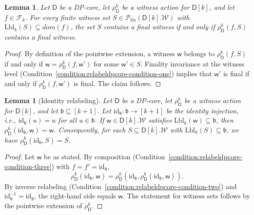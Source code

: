 \documentclass[11pt,a4paper]{article}
\newtheorem{lemma}[theorem]{Lemma}
\newcommand{\treewidthvalue}{k}
\newcommand{\abag}{\mathfrak{b}}
\newcommand{\allwitnesses}{\mathcal{W}}
\newcommand{\awitness}{\mathsf{w}}
\newcommand{\finitepowerset}[1]{\mathcal{P}_{\mathrm{fin}}(#1)}
\newcommand{\dpcore}{\mathsf{D}}
\newcommand{\witnessset}{S}
\newcommand{\domain}{dom}
\newcommand{\relabelingfunction}{f}
\newcommand{\relabelclass}{\mathcal{F}}
\newcommand{\action}{\rho}
\begin{document}
\begin{lemma}
\label{lemma:witness-action-finality-sets}
Let $\dpcore$ be a DP-core, let $\action_{\dpcore}^{\treewidthvalue}$ be a witness action for $\dpcore[\treewidthvalue]$, and let $\relabelingfunction\in \relabelclass_{\treewidthvalue}$. For every finite witness set $\witnessset\in \finitepowerset{\dpcore[\treewidthvalue].\allwitnesses}$ with $\mathrm{Lbl}_{\treewidthvalue}(\witnessset)\subseteq \domain(\relabelingfunction)$, the set $\witnessset$ contains a final witness if and only if $\action_{\dpcore}^{\treewidthvalue}(\relabelingfunction,\witnessset)$ contains a final witness.
\end{lemma}
\begin{proof}
By definition of the pointwise extension, a witness $\awitness$ belongs to $\action_{\dpcore}^{\treewidthvalue}(\relabelingfunction,\witnessset)$ if and only if $\awitness=\action_{\dpcore}^{\treewidthvalue}(\relabelingfunction,\awitness')$ for some $\awitness'\in \witnessset$.
Finality invariance at the witness level (Condition~\ref{condition:relabeldpcore-condition-one}) implies that $\awitness'$ is final if and only if $\action_{\dpcore}^{\treewidthvalue}(\relabelingfunction,\awitness')$ is final. The claim follows.
\end{proof}

\begin{lemma}[Identity relabeling]
\label{lemma:witness-action-identity}
Let $\dpcore$ be a DP-core, let $\action_{\dpcore}^{\treewidthvalue}$ be a witness action for $\dpcore[\treewidthvalue]$, and let $\abag\subseteq [\treewidthvalue+1]$. Let $\mathrm{id}_{\abag}:\abag\to [\treewidthvalue+1]$ be the identity injection, i.e., $\mathrm{id}_{\abag}(u)=u$ for all $u\in \abag$. If $\awitness\in \dpcore[\treewidthvalue].\allwitnesses$ satisfies $\mathrm{Lbl}_{\treewidthvalue}(\awitness)\subseteq \abag$, then $\action_{\dpcore}^{\treewidthvalue}(\mathrm{id}_{\abag},\awitness)=\awitness$. Consequently, for each $\witnessset\subseteq \dpcore[\treewidthvalue].\allwitnesses$ with $\mathrm{Lbl}_{\treewidthvalue}(\witnessset)\subseteq \abag$, we have $\action_{\dpcore}^{\treewidthvalue}(\mathrm{id}_{\abag},\witnessset)=\witnessset$.
\end{lemma}
\begin{proof}
Let $\awitness$ be as stated. By composition (Condition~\ref{condition:relabeldpcore-condition-three}) with $\relabelingfunction=\relabelingfunction'=\mathrm{id}_{\abag}$,
\[
\action_{\dpcore}^{\treewidthvalue}(\mathrm{id}_{\abag},\awitness)=\action_{\dpcore}^{\treewidthvalue}(\mathrm{id}_{\abag},\action_{\dpcore}^{\treewidthvalue}(\mathrm{id}_{\abag},\awitness)).
\]
By inverse relabeling (Condition~\ref{condition:relabeldpcore-condition-two}) and $\mathrm{id}_{\abag}^{-1}=\mathrm{id}_{\abag}$, the right-hand side equals $\awitness$. The statement for witness sets follows by the pointwise extension of $\action_{\dpcore}^{\treewidthvalue}$.
\end{proof}
\end{document}
